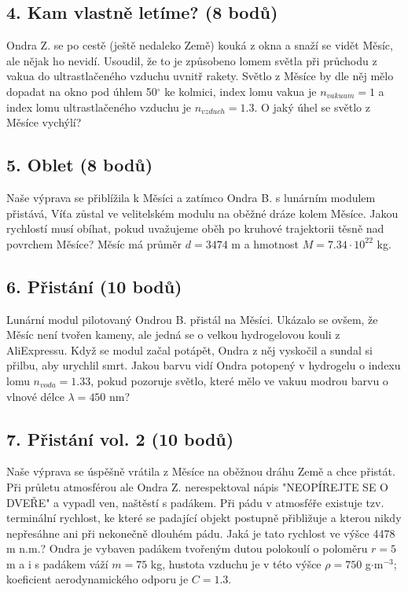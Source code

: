 \documentclass[12pt,a4paper]{article}
\begin{document}
\subsection*{4. Kam vlastně letíme? (8 bodů)}
Ondra Z. se po cestě (ještě nedaleko Země) kouká z okna a snaží se vidět Měsíc, ale nějak ho nevidí. Usoudil, že to je způsobeno lomem světla při průchodu z vakua do ultrastlačeného vzduchu uvnitř rakety. Světlo z Měsíce by dle něj mělo dopadat na okno pod úhlem 50$^\circ$ ke kolmici, index lomu vakua je $n_{vakuum} = 1$ a index lomu ultrastlačeného vzduchu je $n_{vzduch} = 1.3$. O jaký úhel se světlo z Měsíce vychýlí?

\subsection*{5. Oblet (8 bodů)}
Naše výprava se přiblížila k Měsíci a zatímco Ondra B. s lunárním modulem přistává, Víťa zůstal ve velitelském modulu na oběžné dráze kolem Měsíce. Jakou rychlostí musí obíhat, pokud uvažujeme oběh po kruhové trajektorii těsně nad povrchem Měsíce? Měsíc má průměr $d = 3474$ m a hmotnost $M = 7.34\cdot 10^{22}$ kg.

\subsection*{6. Přistání (10 bodů)}
Lunární modul pilotovaný Ondrou B. přistál na Měsíci. Ukázalo se ovšem, že Měsíc není tvořen kameny, ale jedná se o velkou hydrogelovou kouli z AliExpressu. Když se modul začal potápět, Ondra z něj vyskočil a sundal si přilbu, aby urychlil smrt. Jakou barvu vidí Ondra potopený v hydrogelu o indexu lomu $n_{voda} = 1.33$, pokud pozoruje světlo, které mělo ve vakuu modrou barvu o vlnové délce $\lambda = 450$ nm?

\subsection*{7. Přistání vol. 2 (10 bodů)}
Naše výprava se úspěšně vrátila z Měsíce na oběžnou dráhu Země a chce přistát. Při průletu atmosférou ale Ondra Z. nerespektoval nápis "NEOPÍREJTE SE O DVEŘE" a vypadl ven, naštěstí s padákem. Při pádu v atmosféře existuje tzv. terminální rychlost, ke které se padající objekt postupně přibližuje a kterou nikdy nepřesáhne ani při nekonečně dlouhém pádu. Jaká je tato rychlost ve výšce 4478 m n.m.? Ondra je vybaven padákem tvořeným dutou polokoulí o poloměru $r = 5$ m a i s padákem váží $m = 75$ kg, hustota vzduchu je v této výšce $\rho = 750$ g$\cdot$m$^{-3}$; koeficient aerodynamického odporu je $C = 1.3$.
\end{document}
